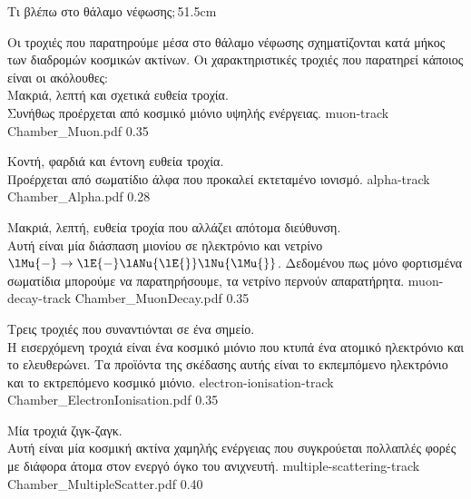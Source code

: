 \begin{MyColumnCenter}[detach title,before upper={\tcbtitle\quad}]{Τι βλέπω στο θάλαμο νέφωσης$;$}{51.5cm}

Οι τροχιές που παρατηρούμε μέσα στο θάλαμο νέφωσης σχηματίζονται 
κατά μήκος των διαδρομών κοσμικών ακτίνων. Οι χαρακτηριστικές τροχιές που παρατηρεί κάποιος είναι οι ακόλουθες:\\

 Μακριά, λεπτή και σχετικά ευθεία
τροχία. \\Συνήθως προέρχεται από κοσμικό μιόνιο υψηλής ενέργειας.
\oneFigPosterNoCaption
    {muon-track}
    {Chamber_Muon.pdf}
    {0.35}

 Κοντή, φαρδιά και έντονη ευθεία
τροχία. \\Προέρχεται από σωματίδιο άλφα που προκαλεί εκτεταμένο ιονισμό.
\oneFigPosterNoCaption
    {alpha-track}
    {Chamber_Alpha.pdf}
    {0.28}

 Μακριά, λεπτή, ευθεία τροχία που αλλάζει απότομα διεύθυνση.\\
Αυτή είναι μία διάσπαση μιονίου σε ηλεκτρόνιο και νετρίνο $\lMu{-} \to \lE{-} \lANu{\lE{}} \lNu{\lMu{}}$.
Δεδομένου πως μόνο φορτισμένα σωματίδια μπορούμε να παρατηρήσουμε, τα
νετρίνο περνούν απαρατήρητα.
\oneFigPosterNoCaption
    {muon-decay-track}
    {Chamber_MuonDecay.pdf}
    {0.35}

 Τρεις τροχιές που συναντιόνται σε ένα σημείο.\\
Η εισερχόμενη τροχιά είναι ένα κοσμικό μιόνιο που κτυπά ένα ατομικό
ηλεκτρόνιο και το ελευθερώνει. Τα προϊόντα της σκέδασης αυτής είναι το εκπεμπόμενο
ηλεκτρόνιο και το εκτρεπόμενο κοσμικό μιόνιο.
\oneFigPosterNoCaption
    {electron-ionisation-track}
    {Chamber_ElectronIonisation.pdf}
    {0.35}

 Μία τροχιά ζιγκ-ζαγκ.\\
Αυτή είναι μία κοσμική ακτίνα χαμηλής ενέργειας που συγκρούεται
πολλαπλές φορές με διάφορα άτομα στον ενεργό όγκο του ανιχνευτή. %
\oneFigPosterNoCaption
    {multiple-scattering-track}
    {Chamber_MultipleScatter.pdf}
    {0.40}

\end{MyColumnCenter}






